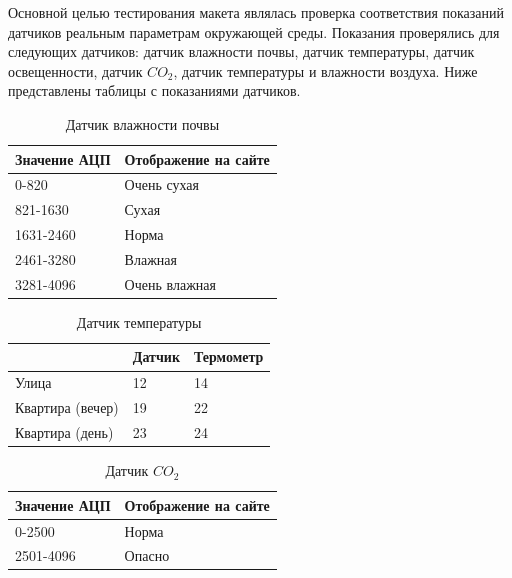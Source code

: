 Основной целью тестирования макета являлась проверка соответствия показаний датчиков реальным параметрам окружающей среды. Показания проверялись для следующих датчиков: датчик влажности почвы, датчик температуры, датчик освещенности, датчик $CO_2$, датчик температуры и влажности воздуха. Ниже представлены таблицы с показаниями датчиков.

\begin{table}[H]
    \centering
    \caption{Датчик влажности почвы}
    \begin{tabular}{|p{6.5cm}|p{6.5cm}|}
        \hline
        Значение АЦП & Отображение на сайте \\
        \hline
        0-820 & Очень сухая \\
        \hline
        821-1630 & Сухая \\
        \hline
        1631-2460 & Норма \\
        \hline
        2461-3280 & Влажная \\
        \hline
        3281-4096 & Очень влажная \\
        \hline
    \end{tabular}
    \label{tab:wet}
\end{table}

\begin{table}[H]
    \centering
    \caption{Датчик температуры}
    \begin{tabular}{|p{4.3cm}|p{4.3cm}|p{4.3cm}|}
        \hline
         & Датчик & Термометр \\
        \hline
        Улица & 12 & 14 \\
        \hline
        Квартира (вечер) & 19 & 22 \\
        \hline
        Квартира (день) & 23 & 24 \\
        \hline
    \end{tabular}
    \label{tab:temp}
\end{table}

\begin{table}[H]
    \centering
    \caption{Датчик $CO_2$}
    \begin{tabular}{|p{6.5cm}|p{6.5cm}|}
        \hline
        Значение АЦП & Отображение на сайте \\
        \hline
        0-2500 & Норма \\
        \hline
        2501-4096 & Опасно \\
        \hline
    \end{tabular}
    \label{tab:co2}
\end{table}

